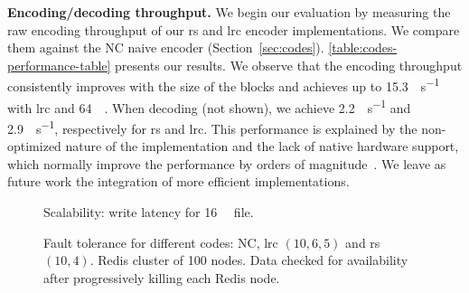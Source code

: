 \textbf{Encoding/decoding throughput.}%
\label{subsec:rw-perf}
We begin our evaluation by measuring the raw encoding throughput of our \ac{rs} and \ac{lrc} encoder implementations.
We compare them against the NC naive encoder (Section~\ref{sec:codes}).
\autoref{table:codes-performance-table} presents our results.  We observe that the encoding throughput consistently improves with the size of the blocks and achieves up to 15.3\si{\mega\byte\per\second} with \ac{lrc} and \SI{64}{\mega\byte}.
When decoding (not shown), we achieve 2.2\si{\mega\byte\per\second} and 2.9\si{\mega\byte\per\second}, respectively for \ac{rs} and \ac{lrc}.
This performance is explained by the non-optimized nature of the implementation and the lack of native hardware support, which normally improve the performance by orders of magnitude~\cite{Burihabwa2016}. We leave as future work the integration of more efficient implementations.


\begin{figure}[t]
    \centering
    
    \caption{Scalability: write latency for \SI{16}{\mebi\byte} file.}
    \label{fig:latency-plot}
\end{figure}


\begin{table}
    \centering
    \caption{Encoding throughput of the different encoders in \si{\mega\byte\per\second}}
    
    \label{table:codes-performance-table}
\end{table}


\begin{figure}[ht]
    \centering
    
    \caption{Fault tolerance for different codes: NC, \ac{lrc} $\left(10,6,5\right)$ and \ac{rs} $\left(10,4\right)$. Redis cluster of 100 nodes. Data checked for availability after progressively killing each Redis node.}
    \label{fig:checksum-plot}
\end{figure}


